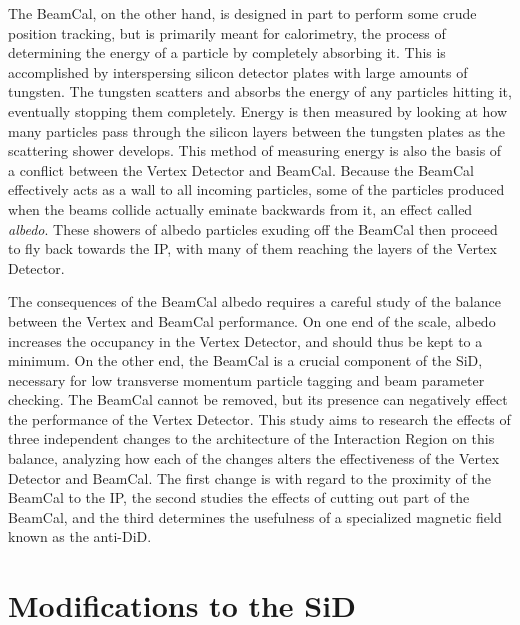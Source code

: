 \documentclass{report}
\begin{document}
                The BeamCal, on the other hand, is designed in part to perform some crude position tracking, but is primarily meant for calorimetry, the process of determining the energy of a particle by completely absorbing it. This is accomplished by interspersing silicon detector plates with large amounts of tungsten. The tungsten scatters and absorbs the energy of any particles hitting it, eventually stopping them completely. Energy is then measured by looking at how many particles pass through the silicon layers between the tungsten plates as the scattering shower develops. This method of measuring energy is also the basis of a conflict between the Vertex Detector and BeamCal. Because the BeamCal effectively acts as a wall to all incoming particles, some of the particles produced when the beams collide actually eminate backwards from it, an effect called \textit{albedo}. These showers of albedo particles exuding off the BeamCal then proceed to fly back towards the IP, with many of them reaching the layers of the Vertex Detector.
                
                The consequences of the BeamCal albedo requires a careful study of the balance between the Vertex and BeamCal performance. On one end of the scale, albedo increases the occupancy in the Vertex Detector, and should thus be kept to a minimum. On the other end, the BeamCal is a crucial component of the SiD, necessary for low transverse momentum particle tagging and beam parameter checking. The BeamCal cannot be removed, but its presence can negatively effect the performance of the Vertex Detector. This study aims to research the effects of three independent changes to the architecture of the Interaction Region on this balance, analyzing how each of the changes alters the effectiveness of the Vertex Detector and BeamCal. The first change is with regard to the proximity of the BeamCal to the IP, the second studies the effects of cutting out part of the BeamCal, and the third determines the usefulness of a specialized magnetic field known as the anti-DiD.



        \section{Modifications to the SiD} \label{sect__sid_mods}
\end{document}
